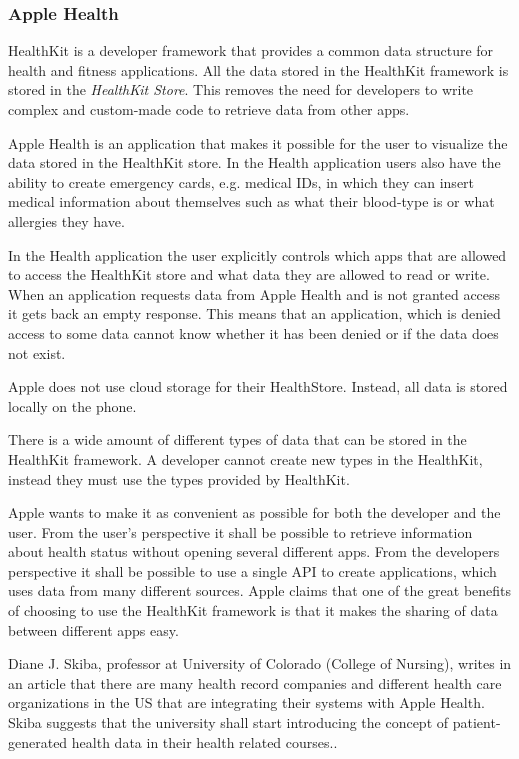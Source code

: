 \documentclass{cslthse-msc}
\begin{document}
\subsubsection{Apple Health}

HealthKit is a developer framework that provides a common data structure for health and fitness applications. All the data stored in the HealthKit framework is stored in the \emph{HealthKit Store}. This removes the need for developers to write complex and custom-made code to retrieve data from other apps.\cite{AppleHealthKitFramework}

Apple Health is an application that makes it possible for the user to visualize the data stored in the HealthKit store. In the Health application users also have the ability to create emergency cards, e.g. medical IDs, in which they can insert medical information about themselves such as what their blood-type is or what allergies they have.

In the Health application the user explicitly controls which apps that are allowed to access the HealthKit store and what data they are allowed to read or write. When an application requests data from Apple Health and is not granted access it gets back an empty response. This means that an application, which is denied access to some data cannot know whether it has been denied or if the data does not exist.

Apple does not use cloud storage for their HealthStore. Instead, all data is stored locally on the phone. 

There is a wide amount of different types of data that can be stored in the HealthKit framework. A developer cannot create new types in the HealthKit, instead they must use the types provided by HealthKit. 

Apple wants to make it as convenient as possible for both the developer and the user. From the user's perspective it shall be possible to retrieve information about health status without opening several different apps. From the developers perspective it shall be possible to use a single API to create applications, which uses data from many different sources. Apple claims that one of the great benefits of choosing to use the HealthKit framework is that it makes the sharing of data between different apps easy.

Diane J. Skiba, professor at University of Colorado (College of Nursing), writes in an article that there are many health record companies and different health care organizations in the US that are integrating their systems with Apple Health\cite{skiba2014connected}. Skiba suggests that the university shall start introducing the concept of patient-generated health data in their health related courses.\cite{skiba2014connected}. 
\end{document}
